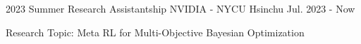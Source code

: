 

\begin{cventries}


  \cventry
  {2023 Summer Research Assistantship} %
  {NVIDIA - NYCU} %
  {Hsinchu} %
  {Jul. 2023 - Now} %
  {
    \begin{cvitems} %
      \item {Research Topic: Meta RL for Multi-Objective Bayesian Optimization}
    \end{cvitems}
  }
\end{cventries}
